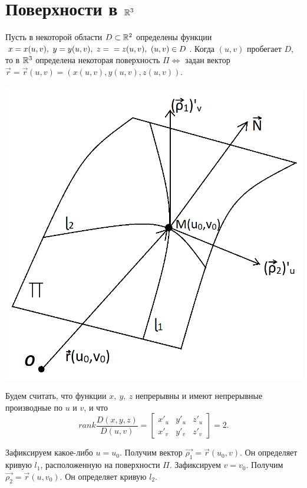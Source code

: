 \documentclass[../../main.tex]{subfiles}
\begin{document}
\section{Поверхности в $\mathbb{R}^3$}
\label{sec:surface-r3}

Пусть в некоторой области $D \subset \mathbb{R}^2$ определены функции 
$x = x(u,v),\ y =y(u,v),\ z = \\ = z(u,v),\ (u,v) \in D$. 
Когда $(u,v)$ пробегает $D$, то в $\mathbb{R}^3$
определена некоторая поверхность $\Pi 
\iff$ задан вектор $\vec{r} = \vec{r}(u,v) = (x(u,v), y(u,v), z(u,v))$.

\begin{center}
\includegraphics[scale = 0.5]{lec21_4.png}
\end{center}

Будем считать, что функции $x,\ y,\ z$ непрерывны и 
имеют непрерывные производные по $u$ и $v$, и что
\begin{equation}
\label{lec_21, num_2}
rank \dfrac{D(x,y,z)}{D(u,v)} = 
\begin{bmatrix}
x'_u & y'_u & z'_u \\
x'_v & y'_v & z'_v
\end{bmatrix} = 2.
\end{equation}

Зафиксируем какое-либо $u=u_0$. Получим вектор
$\vec{\rho_1} = \vec{r}(u_0,v)$. 
Он определяет кривую $l_1$, расположенную на поверхности $\Pi$.
Зафиксируем $v = v_0$. Получим $\vec{\rho_2} = \vec{r}(u,v_0)$. 
Он определяет кривую $l_2$.
\end{document}

